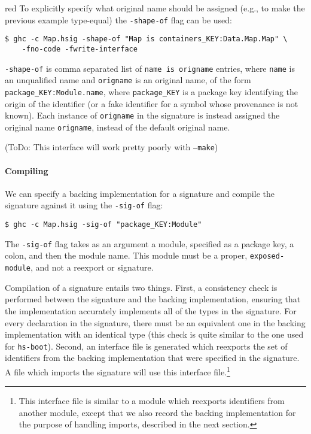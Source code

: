 \documentclass{article}
\newcommand{\Red}[1]{{\color{red} #1}}
\begin{document}
\begin{color}{red}
To explicitly specify what original name should be assigned (e.g.,
to make the previous example type-equal) the \texttt{-shape-of} flag
can be used:

\begin{verbatim}
$ ghc -c Map.hsig -shape-of "Map is containers_KEY:Data.Map.Map" \
    -fno-code -fwrite-interface
\end{verbatim}

\texttt{-shape-of} is comma separated list of \texttt{name is origname}
entries, where \texttt{name} is an unqualified name and
\texttt{origname} is an original name, of the form
\texttt{package\_KEY:Module.name}, where \texttt{package\_KEY} is a
package key identifying the origin of the identifier (or a fake
identifier for a symbol whose provenance is not known).  Each instance
of \texttt{origname} in the signature is instead assigned the original
name \texttt{origname}, instead of the default original name.

(ToDo: This interface will work pretty poorly with \texttt{--make})
\end{color}

\paragraph{Compiling} We can specify a backing implementation for
a signature and compile the signature against it using the
\texttt{-sig-of} flag:

\begin{verbatim}
$ ghc -c Map.hsig -sig-of "package_KEY:Module"
\end{verbatim}

The \texttt{-sig-of} flag takes as an argument a module, specified
as a package key, a colon, and then the module name.  \Red{This module
must be a proper, \texttt{exposed-module}, and not a reexport or
signature.}

Compilation of a signature entails two things.  First, a consistency
check is performed between the signature and the backing
implementation, ensuring that the implementation accurately implements
all of the types in the signature.  For every declaration in the
signature, there must be an equivalent one in the backing implementation
with an identical type (this check is quite similar to the one used
for \texttt{hs-boot}).  Second, an interface file is generated
which reexports the set of identifiers from the backing
implementation that were specified in the signature. A file which
imports the signature will use this interface file.\footnote{This
interface file is similar to a module which reexports identifiers
from another module, except that we also record the backing implementation
for the purpose of handling imports, described in the next section.}
\end{document}
